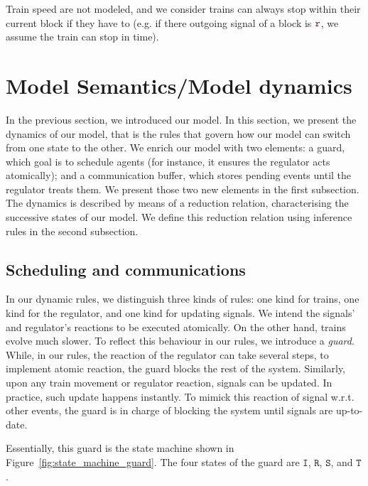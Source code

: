 \documentclass[runningheads]{llncs}
\newcommand{\sigred}{{\mbox{${\color{red!50!black}\mathtt{r}}$}}\xspace}
\newcommand{\guardFmt}[1]{{\color{guardcolor} \ensuremath{\mathtt{#1}}}}
\newcommand{\guardT}{\guardFmt{T}}
\newcommand{\guardS}{\guardFmt{S}}
\newcommand{\guardR}{\guardFmt{R}}
\newcommand{\guardI}{\guardFmt{I}}
\begin{document}
Train speed are not modeled, and we consider trains can always stop within their current block if they have to (e.g. if there outgoing signal of a block is \sigred, we assume the train can stop in time).


\section{Model Semantics/Model dynamics}
\label{sec:model_semantics}

In the previous section, we introduced our model. In this section, we present the dynamics of our model, that is the rules that govern how our model can switch from one state to the other.
We enrich our model with two elements: a guard, which goal is to schedule agents (for instance, it ensures the regulator acts atomically); and a communication buffer, which stores pending events until the regulator treats them. We present those two new elements in the first subsection.
The dynamics is described by means of a reduction relation, characterising the successive states of our model. We define this reduction relation using inference rules in the second subsection.


\subsection{Scheduling and communications}

In our dynamic rules, we distinguish three kinds of rules: one kind for trains, one kind for the regulator, and one kind for updating signals. We intend the signals' and regulator's reactions to be executed atomically. On the other hand, trains evolve much slower. To reflect this behaviour in our rules, we introduce a \emph{guard}. While, in our rules, the reaction of the regulator can take several steps, to implement atomic reaction, the guard blocks the rest of the system. Similarly, upon any train movement or regulator reaction, signals can be updated. In practice, such update happens instantly. To mimick this reaction of signal w.r.t. other events, the guard is in charge of blocking the system until signals are up-to-date.

Essentially, this guard is the state machine shown in Figure~\ref{fig:state_machine_guard}. The four states of the guard are \guardI, \guardR, \guardS, and \guardT.
\end{document}
